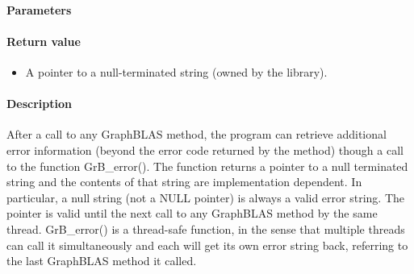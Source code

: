 \paragraph{Parameters}

\paragraph{Return value}
\begin{itemize}[leftmargin=0.3in]
	\item[] A pointer to a null-terminated string (owned by the library).
\end{itemize}

\paragraph{Description}


After a call to any GraphBLAS method, the program can retrieve additional
error information (beyond the error code returned by the method) though a
call to the function {\sf GrB\_error()}. 
The function returns a pointer to a null terminated string and the contents of that string
are implementation dependent. In particular, a null string (not a {\sf NULL} pointer) is always a valid error string.
The pointer is valid until the next call to any GraphBLAS method by the same thread.
{\sf GrB\_error()} is a thread-safe function, in the sense that multiple threads can
call it simultaneously and each will get its own error string back, referring to the
last GraphBLAS method it called.
